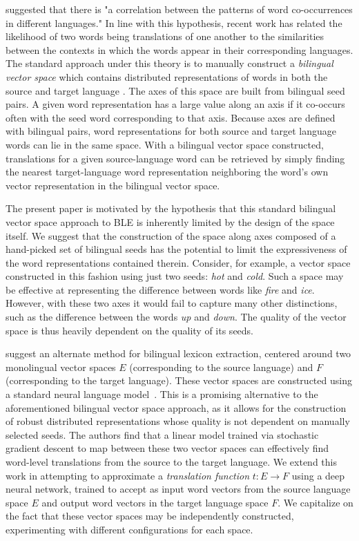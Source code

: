 \documentclass[11pt]{article}
\begin{document}
 suggested that there is "a correlation between the patterns
of word co-occurrences in different languages." In line with this hypothesis,
recent work has related the likelihood of two words being translations of one
another to the similarities between the contexts in which the words appear in
their corresponding languages. The standard approach under this theory is to
manually construct a \textit{bilingual vector space} which contains distributed
representations of words in both the source and target language
\cite{fung1998,vulic2013}. The axes of this space are built from
bilingual seed pairs. A given word representation has a large value along an axis
if it co-occurs often with the seed word corresponding to that axis. Because
axes are defined with bilingual pairs, word representations for both source and
target language words can lie in the same space. With a bilingual vector space
constructed, translations for a given source-language word can be retrieved by
simply finding the nearest target-language word representation neighboring the
word's own vector representation in the bilingual vector space.

The present paper is motivated by the hypothesis that this standard bilingual
vector space approach to BLE is inherently limited by the design of the space
itself. We suggest that the construction of the space along axes composed of a
hand-picked set of bilingual seeds has the potential to limit the expressiveness
of the word representations contained therein. Consider, for example, a vector
space constructed in this fashion using just two seeds: \textit{hot} and
\textit{cold}. Such a space may be effective at representing the difference
between words like \textit{fire} and \textit{ice}. However, with these two axes
it would fail to capture many other distinctions, such as the difference between
the words \textit{up} and \textit{down}. The quality of the vector space is thus
heavily dependent on the quality of its seeds.

 suggest an alternate method for bilingual
lexicon extraction, centered around two monolingual vector spaces $E$
(corresponding to the source language) and $F$ (corresponding to the target
language). These vector spaces are constructed using a standard neural language
model~\cite{mikolov2013}. This is a promising alternative to the aforementioned
bilingual vector space approach, as it allows for the construction of robust
distributed representations whose quality is not dependent on manually selected
seeds. The authors find that a linear model trained via stochastic gradient
descent to map between these two vector spaces can effectively find word-level
translations from the source to the target language. We extend this work in
attempting to approximate a \emph{translation function} $t : E \to F$ using a
deep neural network, trained to accept as input word vectors from the source
language space $E$ and output word vectors in the target language space $F$. We
capitalize on the fact that these vector spaces may be independently
constructed, experimenting with different configurations for each space.
\end{document}
